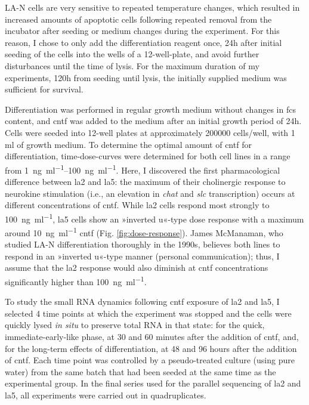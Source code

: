 LA-N cells are very sensitive to repeated temperature changes, which resulted in increased amounts of apoptotic cells following repeated removal from the incubator after seeding or medium changes during the experiment. For this reason, I chose to only add the differentiation reagent once, 24h after initial seeding of the cells into the wells of a 12-well-plate, and avoid further disturbances until the time of lysis. For the maximum duration of my experiments, 120h from seeding until lysis, the initially supplied medium was sufficient for survival.

Differentiation was performed in regular growth medium without changes in \ac{fcs} content, and \ac{cntf} was added to the medium after an initial growth period of 24h. Cells were seeded into 12-well plates at approximately \num{200000} cells/well, with 1 ml of growth medium. To determine the optimal amount of \ac{cntf} for differentiation, time-dose-curves were determined for both cell lines in a range from \SIrange{1}{100}{\nano\gram\per\milli\litre}. Here, I discovered the first pharmacological difference between \ac{la2} and \ac{la5}: the maximum of their cholinergic response to neurokine stimulation (i.e., an elevation in \textit{\ac{chat}} and \textit{\ac{slc}} transcription) occurs at different concentrations of \ac{cntf}. While \ac{la2} cells respond most strongly to \SI{100}{\nano\gram\per\milli\litre}, \ac{la5} cells show an »inverted u«-type dose response with a maximum around \SI{10}{\nano\gram\per\milli\litre} \ac{cntf} (Fig. \ref{fig:dose-response}). James McManaman, who studied LA-N differentiation thoroughly in the 1990s\cite{McManaman1991}, believes both lines to respond in an »inverted u«-type manner (personal communication); thus, I assume that the \ac{la2} response would also diminish at \ac{cntf} concentrations significantly higher than  \SI{100}{\nano\gram\per\milli\litre}.

To study the small RNA dynamics following \ac{cntf} exposure of \ac{la2} and \ac{la5}, I selected 4 time points at which the experiment was stopped and the cells were quickly lysed \textit{in situ} to preserve total RNA in that state: for the quick, immediate-early-like phase, at 30 and 60 minutes after the addition of \ac{cntf}, and, for the long-term effects of differentiation, at 48 and 96 hours after the addition of \ac{cntf}. Each time point was controlled by a pseudo-treated culture (using pure water) from the same batch that had been seeded at the same time as the experimental group. In the final series used for the parallel sequencing of \ac{la2} and \ac{la5}, all experiments were carried out in quadruplicates. 

